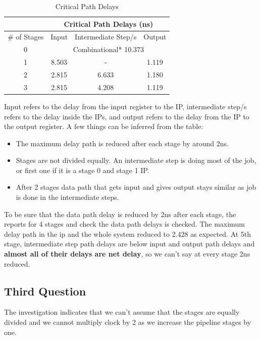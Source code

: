 \documentclass{report}
\begin{document}
\begin{table}[h!]
    \centering
    \begin{tabular}{c|c|c|c}
    \toprule
    & \multicolumn{3}{c}{Critical Path Delays (ns)} \\
    \midrule
    \# of Stages  & Input & Intermediate Step/s & Output \\
    \midrule
    0 & \multicolumn{3}{c}{Combinational* \hspace{30pt} 10.373} \\
    \midrule
    1 & 8.503 & - & 1.119 \\
    \midrule
    2 & 2.815 & 6.633 & 1.180 \\
    \midrule
    3 & 2.815 & 4.208 & 1.119 \\
    \bottomrule
    \end{tabular}
    \caption{Critical Path Delays}
    \label{tab:critical_path_delays}
    \end{table}
Input refers to the delay from the input register to the IP, intermediate step/s refers to the delay inside the IPs, and output refers to the delay from the IP to the output register.
A few things can be inferred from the table:
\begin{itemize}
    \item The maximum delay path is reduced after each stage by around 2ns.
    \item Stages are not divided equally. An intermediate step is doing most of the job, or first one if it is a stage 0 and stage 1 IP.
    \item After 2 stages data path that gets input and gives output stays similar as job is done in the intermediate steps. 
\end{itemize}

To be sure that the data path delay is reduced by 2ns after each stage, the reports for 4 stages and check the data path delays is checked. The maximum delay path in the ip and the whole system reduced to 2.428 as expected. At 5th stage, intermediate step path delays are below input and output path delays and \textbf{almost all of their delays are net delay}, so we can't say at every stage 2ns reduced.

\subsection{Third Question}
The investigation indicates that we can't assume that the stages are equally divided and we cannot multiply clock by 2 as we increase the pipeline stages by one.
\end{document}
